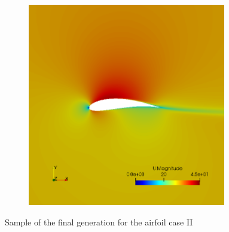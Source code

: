 \begin{figure}[h!]
\begin{subfigure}[t]{0.31\textwidth}
    \end{subfigure}
    \begin{subfigure}[t]{0.31\textwidth}
        \includegraphics[width=0.95\textwidth, height=0.17\textheight]{Figures/4/LDAg10i53.png}
    \end{subfigure}
    \caption{Sample of the final generation for the airfoil case II}
    \label{fig:finalLD}
\end{figure}
